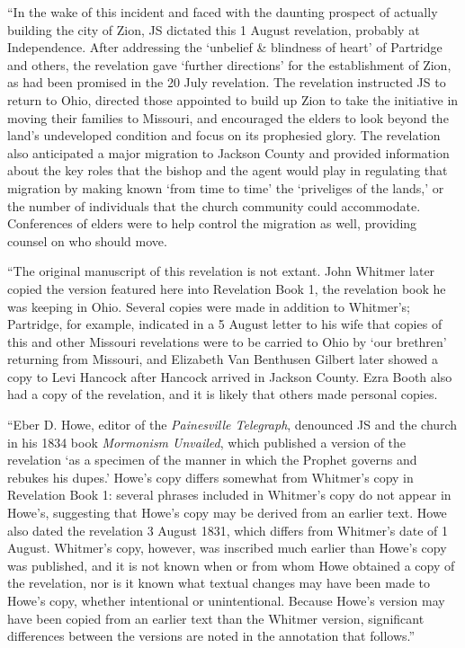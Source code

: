 			``In the wake of this incident and faced with the daunting prospect of actually building the city of Zion, JS dictated this 1 August revelation, probably at Independence. After addressing the `unbelief \& blindness of heart' of Partridge and others, the revelation gave `further directions' for the establishment of Zion, as had been promised in the 20 July revelation. The revelation instructed JS to return to Ohio, directed those appointed to build up Zion to take the initiative in moving their families to Missouri, and encouraged the elders to look beyond the land's undeveloped condition and focus on its prophesied glory. The revelation also anticipated a major migration to Jackson County and provided information about the key roles that the bishop and the agent would play in regulating that migration by making known `from time to time' the `priveliges of the lands,' or the number of individuals that the church community could accommodate. Conferences of elders were to help control the migration as well, providing counsel on who should move.
			
			``The original manuscript of this revelation is not extant. John Whitmer later copied the version featured here into Revelation Book 1, the revelation book he was keeping in Ohio. Several copies were made in addition to Whitmer's; Partridge, for example, indicated in a 5 August letter to his wife that copies of this and other Missouri revelations were to be carried to Ohio by `our brethren' returning from Missouri, and Elizabeth Van Benthusen Gilbert later showed a copy to Levi Hancock after Hancock arrived in Jackson County. Ezra Booth also had a copy of the revelation, and it is likely that others made personal copies.
			
			``Eber D. Howe, editor of the \textit{Painesville Telegraph}, denounced JS and the church in his 1834 book \textit{Mormonism Unvailed}, which published a version of the revelation `as a specimen of the manner in which the Prophet governs and rebukes his dupes.' Howe's copy differs somewhat from Whitmer's copy in Revelation Book 1: several phrases included in Whitmer's copy do not appear in Howe's, suggesting that Howe's copy may be derived from an earlier text. Howe also dated the revelation 3 August 1831, which differs from Whitmer's date of 1 August. Whitmer's copy, however, was inscribed much earlier than Howe's copy was published, and it is not known when or from whom Howe obtained a copy of the revelation, nor is it known what textual changes may have been made to Howe's copy, whether intentional or unintentional. Because Howe's version may have been copied from an earlier text than the Whitmer version, significant differences between the versions are noted in the annotation that follows.''
			
